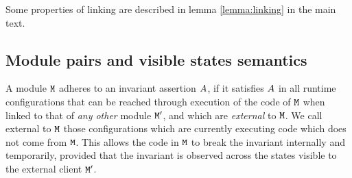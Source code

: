 Some properties of linking are described in lemma \ref{lemma:linking} in the main text. \sophia{
%
%
%
%
 For the proof, 
\sd{ (1) and (2) follow from Definition \ref{def:link}. (3) follows from \ref{def:link}, and the fact that if a lookup $\mathcal \M$ is
defined for $\M$, then it is also defined for $\M\link\M'$ and returns the same method, and similar result for class lookup.}
}


 \subsection{Module pairs and visible states semantics}

A module $\M$ adheres to an invariant assertion  $A$, if it satisfies
$A$ in all runtime configurations that  can be reached through execution of the code of $\M$ when linked to that
of {\em any other} module ${\mbox{\tt{\ensuremath{{\mbox{\tt{M}}}}}}}'$, and
which are {\em external} to $\M$. We call external to $\M$ those
configurations which are currently executing code which does not come from $\M$. This allows the code in $\M$ to break
the invariant internally and temporarily, provided that the invariant is observed across the states visible to the external client ${\mbox{\tt{\ensuremath{{\mbox{\tt{M}}}}}}}'$.

